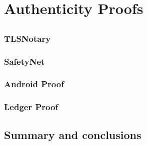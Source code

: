 \chapter{Authenticity Proofs}\label{chap:chap4}

\section*{}

\subsection{TLSNotary}

\subsection{SafetyNet}

\subsection{Android Proof}

\subsection{Ledger Proof}

\section{Summary and conclusions}
